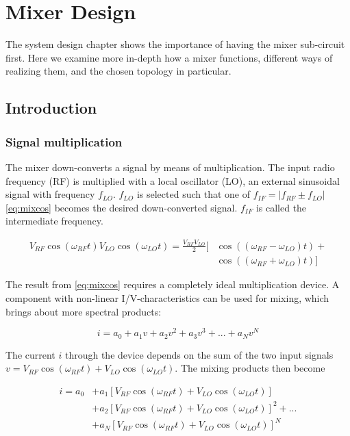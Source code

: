 \chapter{Mixer Design}\label{ch:mixer}

	The system design chapter shows the importance of having the mixer sub-circuit first. Here we examine more in-depth how a mixer functions, different ways of realizing them, and the chosen topology in particular.

	\section{Introduction}
		\subsection{Signal multiplication}\label{sec:mixer_introduction}
			The mixer down-converts a signal by means of multiplication. The input radio frequency (RF) is multiplied with a local oscillator (LO), an external sinusoidal signal with frequency $f_{LO}$. $f_{LO}$ is selected such that one of $f_{IF}=|f_{RF}\pm f_{LO}|$ \eqref{eq:mixcos} becomes the desired down-converted signal. $f_{IF}$ is called the intermediate frequency.\autocite{maas92}

			\begin{align} \label{eq:mixcos}
				V_{RF}\cos(\omega_{RF}t)V_{LO}\cos(\omega_{LO}t)=\frac{V_{RF}V_{LO}}{2}\big[ & \cos((\omega_{RF}-\omega_{LO})t) + \nonumber \\
				& \cos((\omega_{RF}+\omega_{LO})t) \big]
			\end{align}

			The result from \autoref{eq:mixcos} requires a completely ideal multiplication device. A component with non-linear I/V-characteristics can be used for mixing, which brings about more spectral products:\autocite{bahl03}

			\begin{equation}\label{eq:poweriv}
				i = a_0 + a_1v + a_2v^2 + a_3v^3 + ... + a_Nv^N
			\end{equation}

			The current $i$ through the device depends on the sum of the two input signals $v=V_{RF}\cos(\omega_{RF}t) + V_{LO}\cos(\omega_{LO}t)$. The mixing products then become

			\begin{align}\label{eq:mixedseries}
				i = a_0 &+ a_1\left[ V_{RF}\cos(\omega_{RF}t) + V_{LO}\cos(\omega_{LO}t) \right] \nonumber \\
				& + a_2\left[ V_{RF}\cos(\omega_{RF}t) + V_{LO}\cos(\omega_{LO}t) \right]^2 + ... \nonumber \\
				& + a_N\left[ V_{RF}\cos(\omega_{RF}t) + V_{LO}\cos(\omega_{LO}t) \right]^N
			\end{align}

